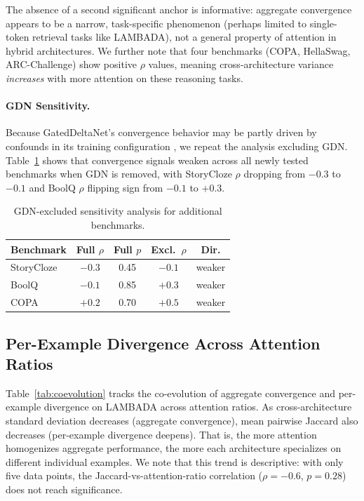 \documentclass[11pt,a4paper]{article}
\begin{document}
The absence of a second significant anchor is informative: aggregate convergence appears to be a narrow, task-specific phenomenon (perhaps limited to single-token retrieval tasks like LAMBADA), not a general property of attention in hybrid architectures. We further note that four benchmarks (COPA, HellaSwag, ARC-Challenge) show positive $\rho$ values, meaning cross-architecture variance \emph{increases} with more attention on these reasoning tasks.

\paragraph{GDN Sensitivity.}
Because GatedDeltaNet's convergence behavior may be partly driven by confounds in its training configuration \citep{wang2025mamba}, we repeat the analysis excluding GDN. Table~\ref{tab:gdn_excluded} shows that convergence signals weaken across all newly tested benchmarks when GDN is removed, with StoryCloze $\rho$ dropping from $-0.3$ to $-0.1$ and BoolQ $\rho$ flipping sign from $-0.1$ to $+0.3$.

\begin{table}[t]
\centering
\caption{GDN-excluded sensitivity analysis for additional benchmarks.}
\label{tab:gdn_excluded}
\small
\begin{tabular}{lcccc}
\toprule
\textbf{Benchmark} & \textbf{Full $\rho$} & \textbf{Full $p$} & \textbf{Excl.\ $\rho$} & \textbf{Dir.} \\
\midrule
StoryCloze & $-0.3$ & 0.45 & $-0.1$ & weaker \\
BoolQ & $-0.1$ & 0.85 & $+0.3$ & weaker \\
COPA & $+0.2$ & 0.70 & $+0.5$ & weaker \\
\bottomrule
\end{tabular}
\end{table}

\subsection{Per-Example Divergence Across Attention Ratios}
\label{sec:bridge}

Table~\ref{tab:coevolution} tracks the co-evolution of aggregate convergence and per-example divergence on LAMBADA across attention ratios. As cross-architecture standard deviation decreases (aggregate convergence), mean pairwise Jaccard also decreases (per-example divergence deepens). That is, the more attention homogenizes aggregate performance, the more each architecture specializes on different individual examples. We note that this trend is descriptive: with only five data points, the Jaccard-vs-attention-ratio correlation ($\rho = -0.6$, $p = 0.28$) does not reach significance.
\end{document}
